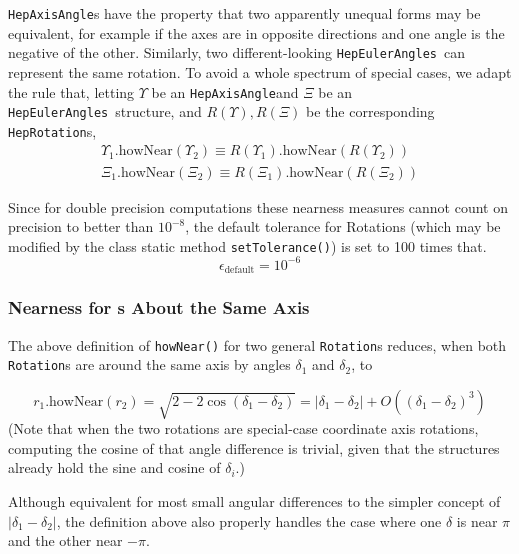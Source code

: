 \documentclass[twoside,12pt]{article}
\def \Ro {{\tt HepRotation}}
\def \Rotation {{\tt Rotation}}
\def \Ax {{\tt HepAxisAngle}}
\def \Es {{\tt HepEulerAngles}}
\begin{document}
\Ax s have the property that two apparently unequal forms may be equivalent,
for example if the axes are in opposite directions and one angle is the
negative of the other.  
Similarly, two different-looking \Es\ can represent the same
rotation.  To avoid a whole spectrum of special cases, we adapt the rule that,
letting $\Upsilon$ be an \Ax and $\Xi$ be an \Es\ structure, and
$R(\Upsilon), R(\Xi)$ be the corresponding \Ro s,
\begin{eqnarray}
  \Upsilon_1 \mbox{.howNear} (\Upsilon_2) \equiv
	R \left( \Upsilon_1 \right) \mbox{.howNear}
	\left( R \left( \Upsilon_2 \right) \right)
	\\
  \Xi_1 \mbox{.howNear} (\Xi_2) \equiv
	R \left( \Xi_1 \right) \mbox{.howNear}
	\left( R \left( \Xi_2 \right) \right)
\end{eqnarray}

Since for double precision computations these nearness measures cannot 
count on precision to better than $10^{-8}$, 
the default tolerance for Rotations 
(which may be modified by the class static method {\tt setTolerance()}) 
is set to 100 times that.
\begin{equation}
  \epsilon_{\mbox{default}} =  10^{-6}
\label{eq:epsildefR}
\end{equation}

\subsubsection{Nearness for \protect\Ro s About the Same Axis}
\label{rotsame}

The above definition of {\tt howNear()} for two general \Rotation s reduces,
when both \Rotation s are around the same axis by angles $\delta_1$ and
$\delta_2$, to

\begin{equation}
 r_1 \mbox{.howNear} (r_2) = \sqrt{ 2 - 2 \cos (\delta_1 - \delta_2) }
 = | \delta_1 - \delta_2 | + O \left( (\delta_1 - \delta_2)^3 \right)
\end{equation}
\noindent
(Note that when the two rotations are special-case coordinate axis rotations,
computing the cosine of that angle difference is trivial, given
that the structures already hold the sine and cosine of $\delta_i$.)

Although equivalent for most small angular differences to the simpler concept
of $ | \delta_1 - \delta_2 | $, the definition above also properly handles the
case where one $\delta$ is near $\pi$ and the other near $-\pi$.
\end{document}
